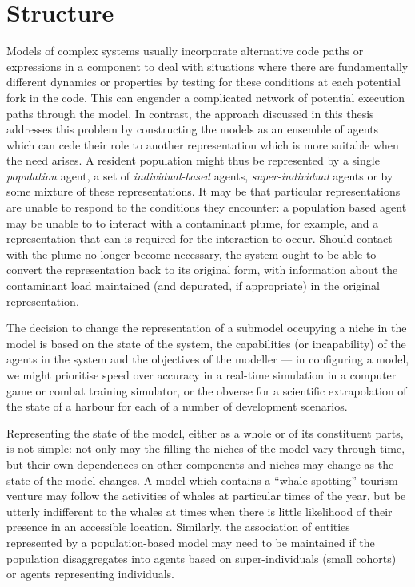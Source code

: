 \section{Structure }
Models of complex systems usually incorporate alternative code paths
or expressions in a component to deal with situations where there are
fundamentally different dynamics or properties by testing for these
conditions at each potential fork in the code. This can engender a
complicated network of potential execution paths through the model.
In contrast, the approach discussed in this thesis addresses this
problem by constructing the models as an ensemble of agents which can
cede their role to another representation which is more suitable when
the need arises.  A resident population might thus be represented by a
single \emph{population\/} agent, a set of \emph{individual-based\/}
agents, \emph{super-individual\/} agents or by some mixture of these
representations.  It may be that particular representations are unable
to respond to the conditions they encounter: a population based agent
may be unable to to interact with a contaminant plume, for example,
and a representation that can is required for the interaction to
occur.  Should contact with the plume no longer become necessary, the
system ought to be able to convert the representation back to its
original form, with information about the contaminant load maintained
(and depurated, if appropriate) in the original representation.

The decision to change the representation of a submodel occupying a
niche in the model is based on the state of the system, the
capabilities (or incapability) of the agents in the system and the
objectives of the modeller --- in configuring a model, we might
prioritise speed over accuracy in a real-time simulation in a computer
game or combat training simulator, or the obverse for a scientific
extrapolation of the state of a harbour for each of a number of
development scenarios.

Representing the state of the model, either as a whole or of its
constituent parts, is not simple: not only may the filling the niches
of the model vary through time, but their own dependences on other
components and niches may change as the state of the model changes. A
model which contains a ``whale spotting'' tourism venture may follow
the activities of whales at particular times of the year, but be
utterly indifferent to the whales at times when there is little
likelihood of their presence in an accessible location. Similarly, the
association of entities represented by a population-based model may
need to be maintained if the population dis\-aggregates into agents
based on super-individuals (small cohorts) or agents representing
individuals.

